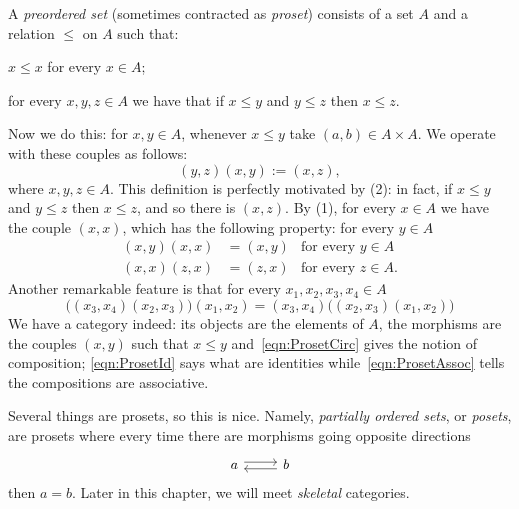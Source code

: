\begin{example}
  A {\em preordered set} (sometimes contracted as {\em proset})
  consists of a set \(A\) and a relation \(\le\) on \(A\) such that:
  \begin{tcbenum}
  \item \(x \le x\) for every \(x \in A\);
  \item for every \(x, y, z \in A\) we have that if \(x \le y\) and
    \(y \le z\) then \(x \le z\).
  \end{tcbenum}
  Now we do this: for \(x, y \in A\), whenever \(x \le y\) take
  \((a, b) \in A \times A\). We operate with these couples as follows:
  \begin{equation}
    (y, z) (x, y) := (x, z), \label{eqn:ProsetCirc}
  \end{equation}
  where \(x, y, z \in A\). This definition is perfectly motivated by
  (2): in fact, if \(x \le y\) and \(y \le z\) then \(x \le z\), and
  so there is \((x, z)\). By (1), for every \(x \in A\) we have the
  couple \((x, x)\), which has the following property: for every
  \(y \in A\)
  \begin{equation}
    \begin{aligned}
      (x, y) (x, x) &= (x, y) & \text{for every } y \in A \\
      (x, x) (z, x) &= (z, x) & \text{for every } z \in A .
    \end{aligned}\label{eqn:ProsetId}
  \end{equation}
  Another remarkable feature is that for every
  \(x_1, x_2, x_3, x_4 \in A\)
  \begin{equation}
    \big((x_3, x_4)(x_2, x_3)\big)(x_1, x_2) = (x_3, x_4)\big((x_2, x_3)(x_1, x_2)\big)\label{eqn:ProsetAssoc}
  \end{equation}
  We have a category indeed: its objects are the elements of \(A\),
  the morphisms are the couples \((x, y)\) such that \(x \le y\)
  and~\eqref{eqn:ProsetCirc} gives the notion of composition;
  \eqref{eqn:ProsetId} says what are identities
  while~\eqref{eqn:ProsetAssoc} tells the compositions are
  associative.
\end{example}

Several things are prosets, so this is nice. Namely, {\em partially
  ordered sets}, or {\em posets}, are prosets where every time there
are morphisms going opposite directions
\[\begin{tikzcd}
    a \ar[r, shift left] & b \ar[l, shift left]
  \end{tikzcd}\] then \(a = b\). Later in this chapter, we will meet
{\em skeletal} categories.

